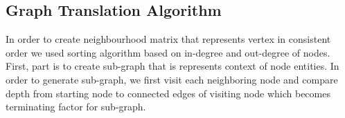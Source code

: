 \subsection{Graph Translation Algorithm}
In order to create neighbourhood matrix that represents vertex in consistent order we used sorting algorithm based on in-degree and out-degree of nodes. First, part is to create sub-graph that is represents context of node entities. In order to generate sub-graph, we first visit each neighboring node and compare depth from starting node to connected edges of visiting node which becomes terminating factor for sub-graph.


